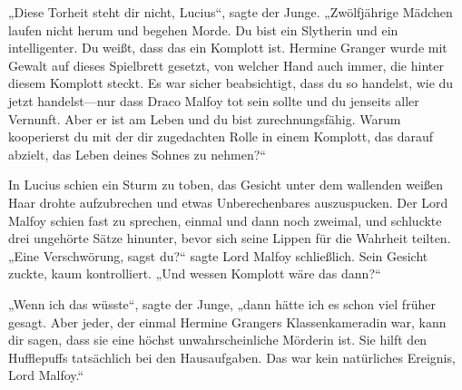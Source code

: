 „Diese Torheit steht dir nicht, Lucius“, sagte der Junge. „Zwölfjährige Mädchen laufen nicht herum und begehen Morde. Du bist ein Slytherin und ein intelligenter. Du weißt, dass das ein Komplott ist. Hermine Granger wurde mit Gewalt auf dieses Spielbrett gesetzt, von welcher Hand auch immer, die hinter diesem Komplott steckt. Es war sicher beabsichtigt, dass du so handelst, wie du jetzt handelst—nur dass Draco Malfoy tot sein sollte und du jenseits aller Vernunft. Aber er ist am Leben und du bist zurechnungsfähig. Warum kooperierst du mit der dir zugedachten Rolle in einem Komplott, das darauf abzielt, das Leben deines Sohnes zu nehmen?“

In Lucius schien ein Sturm zu toben, das Gesicht unter dem wallenden weißen Haar drohte aufzubrechen und etwas Unberechenbares auszuspucken. Der Lord Malfoy schien fast zu sprechen, einmal und dann noch zweimal, und schluckte drei ungehörte Sätze hinunter, bevor sich seine Lippen für die Wahrheit teilten.
„Eine Verschwörung, sagst du?“ sagte Lord Malfoy schließlich. Sein Gesicht zuckte, kaum kontrolliert. „Und wessen Komplott wäre das dann?“

„Wenn ich das wüsste“, sagte der Junge, „dann hätte ich es schon viel früher gesagt. Aber jeder, der einmal Hermine Grangers Klassenkameradin war, kann dir sagen, dass sie eine höchst unwahrscheinliche Mörderin ist. Sie hilft den Hufflepuffs tatsächlich bei den Hausaufgaben. Das war kein natürliches Ereignis, Lord Malfoy.“


